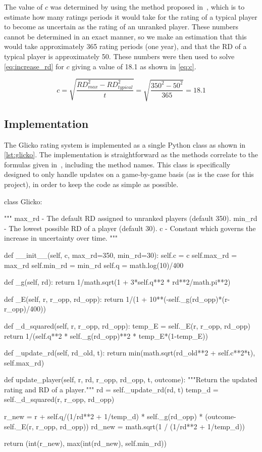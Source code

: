 The value of $c$ was determined by using the method proposed in~\citep{glicko}, which is to estimate how many ratings periods it would take for the rating of a typical player to become as uncertain as the rating of an unranked player.
These numbers cannot be determined in an exact manner, so we make an estimation that this would take approximately 365 rating periods (one year), and that the RD of a typical player is approximately 50.
These numbers were then used to solve \autoref{eq:increase_rd} for $c$ giving a value of 18.1 as shown in \autoref{eq:c}.

\begin{equation} \label{eq:c}
c = \sqrt{\frac{RD^2_{max} - RD^2_{typical}}{t}} = \sqrt{\frac{350^2 - 50^2}{365}} = 18.1
\end{equation}

\subsection{Implementation}
\label{sec:glicko_implementation}
The Glicko rating system is implemented as a single Python class as shown in \autoref{lst:glicko}.
The implementation is straightforward as the methods correlate to the formulas given in~\citep{glicko}, including the method names.
This class is specifically designed to only handle updates on a game-by-game basis (as is the case for this project), in order to keep the code as simple as possible.

\begin{code}[language={Python}, style={PythonDoc}, caption={The \texttt{Glicko} Class}, label={lst:glicko}]
class Glicko:

	"""
	max_rd - The default RD assigned to unranked players (default 350).
	min_rd - The lowest possible RD of a player (default 30).
	c - Constant which governs the increase in uncertainty over time.
	"""

	def __init__(self, c, max_rd=350, min_rd=30):
		self.c = c
		self.max_rd = max_rd
		self.min_rd = min_rd
		self.q = math.log(10)/400

	def _g(self, rd):
		return 1/math.sqrt(1 + 3*self.q**2 * rd**2/math.pi**2)

	def _E(self, r, r_opp, rd_opp):
		return 1/(1 + 10**(-self._g(rd_opp)*(r-r_opp)/400))

	def _d_squared(self, r, r_opp, rd_opp):
		temp_E = self._E(r, r_opp, rd_opp)
		return 1/(self.q**2 * self._g(rd_opp)**2 * temp_E*(1-temp_E))

	def _update_rd(self, rd_old, t):
		return min(math.sqrt(rd_old**2 + self.c**2*t), self.max_rd)

	def update_player(self, r, rd, r_opp, rd_opp, t, outcome):
		"""Return the updated rating and RD of a player."""
		rd = self._update_rd(rd, t)
		temp_d = self._d_squared(r, r_opp, rd_opp)

		r_new = r + self.q/(1/rd**2 + 1/temp_d) * self._g(rd_opp) *
			(outcome-self._E(r, r_opp, rd_opp))
		rd_new = math.sqrt(1 / (1/rd**2 + 1/temp_d))

		return (int(r_new), max(int(rd_new), self.min_rd))
\end{code}


